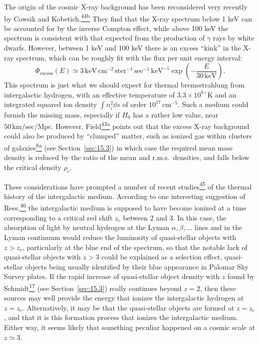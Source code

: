 The origin of the cosmic X-ray background has been reconsidered very recently
by Cowsik and Kobetich.\hyperref[ch15-ref-44b]{\textsuperscript{44b}} They
find that the X-ray spectrum below 1 keV can be accounted for by the inverse
Compton effect, while above 100 keV the spectrum is consistent with that
expected from the production of \(\gamma\) rays by white dwarfs. However,
between 1 keV and 100 keV there is an excess ``kink'' in the X-ray spectrum,
which can be roughly fit with the flux per unit energy interval:
\[
  \Phi_{\mathrm{excess}}(E)
  \simeq
  3\,\mathrm{keV\,cm^{-2}\,ster^{-1}\,sec^{-1}\,keV^{-1}}
  \exp\left(-\frac{E}{30\,\mathrm{keV}}\right).
\]
This spectrum is just what we should expect for thermal bremsstrahlung from
intergalactic hydrogen, with an effective temperature of
\(3.3\times10^{8\circ}\mathrm{K}\) and an integrated squared ion density
\(\int n_i^2\dd s\) of order \(10^{17}\,\mathrm{cm^{-5}}\). Such a medium
could furnish the missing mass, especially if \(H_0\) has a rather low value,
near \(50\,\mathrm{km/sec/Mpc}\). However,
Field\hyperref[ch15-ref-43a]{\textsuperscript{43a}} points out that the excess
X-ray background could also be produced by ``clumped'' matter, such as ionized
gas within clusters of galaxies\hyperref[ch15-ref-8a]{\textsuperscript{8a}}
(see Section~\ref{sec:15.3}) in which case the required mean mass density is
reduced by the ratio of the mean and r.m.s.\ densities, and falls below the
critical density \(\rho_c\).

These considerations have prompted a number of recent
studies\hyperref[ch15-ref-45]{\textsuperscript{45}} of the thermal history of
the intergalactic medium. According to one interesting suggestion of
Rees,\hyperref[ch15-ref-46]{\textsuperscript{46}} the intergalactic medium is
supposed to have become ionized at a time corresponding to a critical red
shift \(z_c\) between 2 and 3. In this case, the absorption of light by neutral
hydrogen at the Lyman \(\alpha,\beta,\ldots\) lines and in the Lyman continuum
would reduce the luminosity of quasi-stellar objects with \(z>z_c\),
particularly at the blue end of the spectrum, so that the notable lack of
quasi-stellar objects with \(z>3\) could be explained as a selection effect,
quasi-stellar objects being usually identified by their blue appearance in
Palomar Sky Survey plates. If the rapid increase of quasi-stellar object
density with \(z\) found by Schmidt\hyperref[ch15-ref-17]{\textsuperscript{17}}
(see Section~\ref{sec:15.3}) really continues beyond \(z=2\), then these
sources may well provide the energy that ionizes the intergalactic hydrogen at
\(z=z_c\). Alternatively, it may be that the quasi-stellar objects are formed
at \(z=z_c\), and that it is this formation process that ionizes the
intergalactic medium. Either way, it seems likely that something peculiar
happened on a cosmic scale at \(z\simeq3\).

